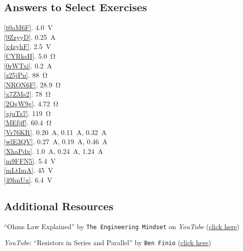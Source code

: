 \documentclass[dvipsnames]{article}
\begin{document}
\clearpage
\subsection*{Answers to Select Exercises}

\ref{t0aM6F}. \SI{4.0}{V}\\
\ref{9ZzyyD}. \SI{0.25}{A}\\
\ref{x4zyhF}. \SI{2.5}{V}\\
\ref{CYRksH}. \SI{5.0}{\ohm}\\
\ref{0rWTxi}. \SI{0.2}{A}\\
\ref{z25jPn}. \SI{88}{\ohm}\\
\ref{NRON6F}. \SI{28.9}{\ohm}\\
\ref{x7ZMs2}. \SI{78}{\ohm}\\
\ref{2QgW9g}. \SI{4.72}{\ohm}\\
\ref{xjuTz7}. \SI{119}{\ohm}\\
\ref{MEfjff}. \SI{60.4}{\ohm}\\
\ref{Vr76KR}. \SI{0.20}{A}, \SI{0.11}{A}, \SI{0.32}{A}\\ 
\ref{wlE3QV}. \SI{0.27}{A}, \SI{0.19}{A}, \SI{0.46}{A}\\ 
\ref{XhaPdx}. \SI{1.0}{A}, \SI{0.24}{A}, \SI{1.24}{A}\\ 
\ref{m9FFN5}. \SI{5.4}{V}\\
\ref{mLtImA}. \SI{45}{V}\\
\ref{49hnUx}. \SI{6.4}{V}\\


\subsection*{Additional Resources}

``Ohms Law Explained'' by \texttt{The Engineering Mindset} on \textit{YouTube} (\href{https://youtu.be/HsLLq6Rm5tU}{click here})

\textit{YouTube}: ``Resistors in Series and Parallel'' by \texttt{Ben Finio} 
(\href{https://youtu.be/bTnQUZ4Hi-E}{click here})

\clearpage
\end{document}
